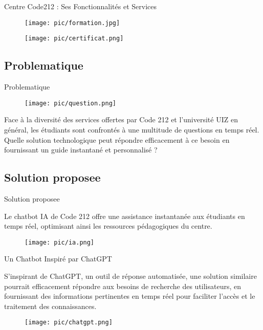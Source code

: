 \documentclass{beamer}
\begin{document}
\begin{frame}{Centre Code212 : Ses Fonctionnalités et Services}

    \begin{figure}[htpb]
        \centering
        \begin{minipage}[b]{0.45\linewidth}
            \centering
            \texttt{[image: pic/formation.jpg]}
        \end{minipage}
        \begin{minipage}[b]{0.45\linewidth}
            \centering
            \texttt{[image: pic/certificat.png]}
        \end{minipage}
    \end{figure}
\end{frame}



\subsection{Problematique}
\begin{frame}{Problematique}
    \begin{figure}[htpb]
        \centering
        \texttt{[image: pic/question.png]}
    \end{figure}
    Face à la diversité des services offertes par Code 212 et l'université UIZ en général, les étudiants sont confrontés à une multitude de questions en temps réel. Quelle solution technologique peut répondre efficacement à ce besoin en fournissant un guide instantané et personnalisé ?
\end{frame}

\subsection{Solution proposee}
\begin{frame}{Solution proposee}

    Le chatbot IA de Code 212 offre une assistance instantanée aux étudiants en temps réel, optimisant ainsi les ressources pédagogiques du centre.
    \begin{figure}[htpb]
        \centering
        \texttt{[image: pic/ia.png]}
    \end{figure}
\end{frame}

\begin{frame}{Un Chatbot Inspiré par ChatGPT}

    S'inspirant de ChatGPT, un outil de réponse automatisée, une solution similaire pourrait efficacement répondre aux besoins de recherche des utilisateurs, en fournissant des informations pertinentes en temps réel pour faciliter l'accès et le traitement des connaissances.

    \begin{figure}[htpb]
        \centering
        \texttt{[image: pic/chatgpt.png]}
    \end{figure}
\end{frame}
\end{document}

